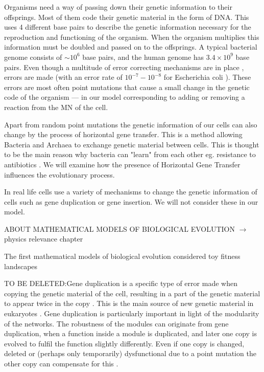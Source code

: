 \documentclass[10pt,a4paper]{article}
\begin{document}
	Organisms need a way of passing down their genetic information to their offsprings. 
	Most of them code their genetic material in the form of DNA. This uses 4 different base pairs to describe the genetic information necessary for the reproduction and functioning of the organism. When the organism multiplies this information must be doubled and passed on to the offsprings. A typical bacterial genome consists of $\sim 10^6$ base pairs, and the human genome has $3.4 \times 10^9$ base pairs. Even though a multitude of error correcting mechanisms are in place \cite{dnarepair}, errors are made (with an error rate of $10^{-7} - 10^{-8}$ for Escherichia coli \cite{dnaerrorrate}). These errors are most often point mutations that cause a small change in the genetic code of the organism --- in our model  corresponding to adding or removing a reaction from the MN of the cell.

	Apart from random point mutations  the genetic information of our cells can also change by the process of horizontal gene transfer. This is a method allowing Bacteria and Archaea to exchange genetic material between cells. This is thought to be the main reason why bacteria can "learn" from each other eg. resistance to antibiotics \cite{horizontalAntibiotics}\cite{horizontalgenetransfer}. We will examine how the presence of Horizontal Gene Transfer influences the evolutionary process.

	In real life cells use a variety of mechanisms to change the genetic information of cells such as gene duplication or gene insertion. We will not consider these in our model. 

	ABOUT MATHEMATICAL MODELS OF BIOLOGICAL EVOLUTION $\rightarrow$ physics relevance chapter

	The first mathematical models of biological evolution considered toy fitness landscapes 

	TO BE DELETED:Gene duplication is a specific type of error made when copying the genetic material of the cell, resulting in a part of the genetic material to appear twice in the copy \cite{geneduplication}. This is the main source of new genetic material in eukaryotes \cite{horizontalgenetransfer}. Gene duplication is particularly important in light of the modularity of the networks. The robustness of the modules can originate from gene duplication, when a function inside a module is duplicated, and later one copy is evolved to fulfil the function slightly differently. Even if one copy is changed, deleted or (perhaps only temporarily) dysfunctional due to a point mutation the other copy can compensate for this \cite{duplicaterole} \cite{complexfeatures}. 
	
\end{document}
